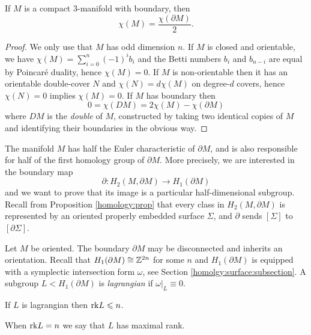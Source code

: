\begin{prop}
If $M$ is a compact 3-manifold with boundary, then 
$$\chi(M) = \frac {\chi(\partial M)}2.$$
\end{prop}
\begin{proof}
We only use that $M$ has odd dimension $n$. If $M$ is closed and orientable, we have $\chi(M) = \sum_{i=0}^n (-1)^i b_i$ and the Betti numbers $b_i$ and $b_{n-i}$ are equal by Poincar\'e duality, hence $\chi(M)=0$. If $M$ is non-orientable then it has an orientable double-cover $N$ and $\chi(N) = d\chi(M)$ on degree-$d$ covers, hence $\chi(N)=0$ implies $\chi(M)=0$.
If $M$ has boundary then 
$$0 = \chi(DM)=2\chi (M) - \chi(\partial M)$$
where $DM$ is the \emph{double} of $M$, constructed by taking two identical copies of $M$ and identifying their boundaries in the obvious way.
\end{proof}

The manifold $M$ has half the Euler characteristic of $\partial M$, and is also responsible for half of the first homology group of $\partial M$. More precisely, we are interested in the boundary map
$$\partial\colon H_2(M,\partial M) \longrightarrow H_1(\partial M)$$
and we want to prove that its image is a particular half-dimensional subgroup.
Recall from Proposition \ref{homology:prop} that every class in $H_2(M,\partial M)$ is represented by an oriented properly embedded surface $\Sigma$, and $\partial$ sends $[\Sigma]$ to $[\partial \Sigma]$.

Let $M$ be oriented. The boundary $\partial M$ may be disconnected and inherits an orientation. Recall that $H_1(\partial M)\cong \mathbb{Z}^{2n}$ for some $n$ and $H_1(\partial M)$ is equipped with a symplectic intersection form $\omega$, see Section \ref{homolgy:surface:subsection}. A subgroup $L<H_1(\partial M)$ is \emph{lagrangian} if $\omega|_L\equiv 0$. 

\begin{ex}
If $L$ is lagrangian then ${\rm rk} L \leqslant n$.
\end{ex}
When ${\rm rk} L = n$ we say that $L$ has maximal rank.

